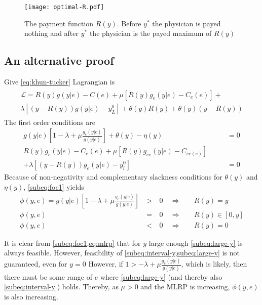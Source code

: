 \begin{figure}[htbp]
    \centering
    \texttt{[image: optimal-R.pdf]}
    \caption{The payment function $R(y)$. Before $y^*$ the physician is payed nothing and after $y^*$ the physician is the payed maximum of $R(y)$ }
    \label{fig:label}
\end{figure}

\subsection{An alternative proof} %
\label{sub:an_alternative_proof}
Give \cref{eq:khun-tucker}  Lagrangian is
\begin{align}
    \begin{split}
        \mathcal{L}=R(y)g(y|e)-C(e)+\mu [R(y)g_e(y|e)-C_e(e)]+ \\ 
        \lambda [(y-R(y))g(y|e)-y_L^0]+\theta(y) R(y)+\theta(y)\left(y-R(y)\right)
    \end{split}
\end{align}
The first order conditions are
\begin{subequations}
\label{eq:foc}
\begin{align}
    g(y|e)\left[1-\lambda+\mu \frac{g_e(y|e)}{g(y|e)}\right] +\theta(y)-\eta(y) & =0 \label{subeq:foc1} \\
    R(y)g_e(y|e)-C_e(e)+\mu\left[R(y)g_{ee}(y|e)- C_{ee(e)}\right] \qquad & \nonumber \\ 
    +\lambda\left[(y-R(y)) g_e(y|e)-y_l^0\right] & =0 \label{subeq:foc2}
\end{align}
\end{subequations}
Because of non-negativity and complementary slackness conditions for $\theta(y)$ and $\eta(y)$, \cref{subeq:foc1} yields
\begin{subequations}
\label{eq:KT-analysis}
\begin{alignat}{3}
\phi(y,e) = g(y|e)\left[1-\lambda+\mu \frac{g_e(y|e)}{g(y|e)}\right]
   & \: > \: & 0 &\enspace \Rightarrow &&\enspace R(y)=y \label{subeq:large-y}\\
 \phi(y,e)   & \: = \: & 0 &\enspace \Rightarrow &&\enspace R(y)\in [0,y] \label{subeq:interval-y} \\
 \phi(y,e)   & \: < \: & 0 &\enspace \Rightarrow &&\enspace R(y) =0 \label{subeq:small-y}
\end{alignat}
\end{subequations}

It is clear from \cref{subeq:foc1,eq:mlrp} that for $y$ large enough \cref{subeq:large-y} is always feasible. However, feasibility of \cref{subeq:interval-y,subeq:large-y} is not guaranteed, even for $y=0$ However, if $1>-\lambda+\mu \frac{g_e(y|e)}{g(y|e)}$, which is likely, then there must be some range of $e$ where \cref{subeq:large-y} (and thereby also \cref{subeq:interval-y}) holds. Thereby, as $\mu>0$ and the MLRP is increasing, $\phi(y,e)$ is also increasing.

